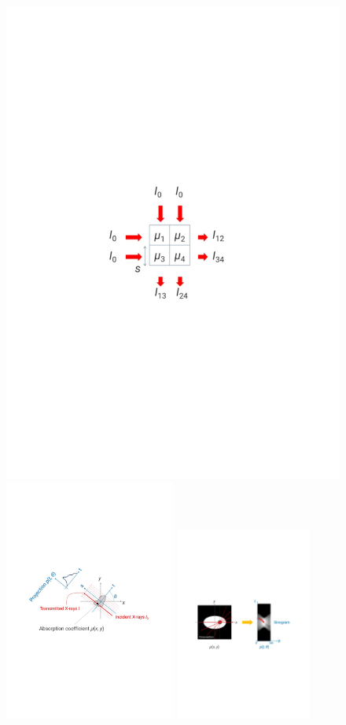\begin{figure}[H]
    \centering
    \includegraphics[width=0.4\linewidth,trim={5cm 10cm 5cm 10cm}, clip]{img/ct_scheme.pdf}
    \includegraphics[width=0.5\textwidth,trim={2.5cm 10cm 3cm 10cm}, clip]{img/ct_projection.pdf}
    \includegraphics[width=0.4\textwidth,trim={3cm 7cm 3cm 10cm}, clip]{img/ct_sinogram.pdf}
\end{figure}


